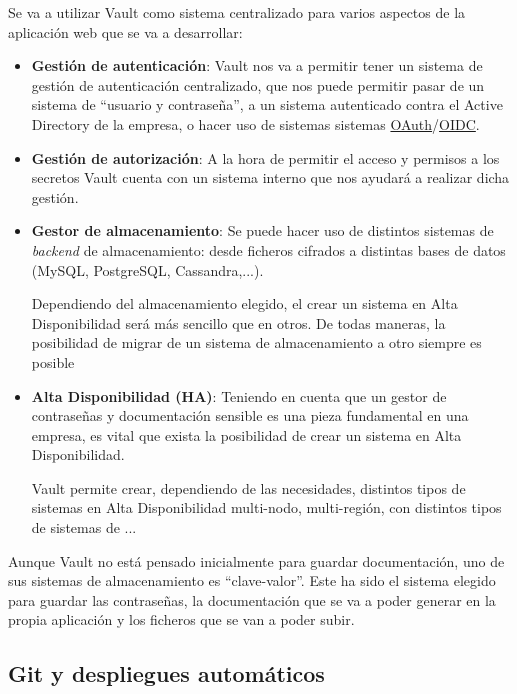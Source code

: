 \documentclass{\ClassPath/viu-tfm-template}
\begin{document}
Se va a utilizar Vault como sistema centralizado para varios aspectos de la aplicación web que se va a desarrollar:

\begin{itemize}
    \item \textbf{Gestión de autenticación}: Vault nos va a permitir tener un sistema de gestión de autenticación centralizado, que nos puede permitir pasar de un sistema de “usuario y contraseña”, a un sistema autenticado contra el Active Directory de la empresa, o hacer uso de sistemas sistemas \href{https://en.wikipedia.org/wiki/OAuth}{OAuth}/\href{https://en.wikipedia.org/wiki/OpenID#OpenID_Connect_(OIDC)}{OIDC}.

    \item \textbf{Gestión de autorización}: A la hora de permitir el acceso y permisos a los secretos Vault cuenta con un sistema interno que nos ayudará a realizar dicha gestión.

    \item \textbf{Gestor de almacenamiento}: Se puede hacer uso de distintos sistemas de \textit{backend} de almacenamiento: desde ficheros cifrados a distintas bases de datos (MySQL, PostgreSQL, Cassandra,...).

    Dependiendo del almacenamiento elegido, el crear un sistema en Alta Disponibilidad será más sencillo que en otros. De todas maneras, la posibilidad de migrar de un sistema de almacenamiento a otro siempre es posible

    \item \textbf{Alta Disponibilidad (HA)}: Teniendo en cuenta que un gestor de contraseñas y documentación sensible es una pieza fundamental en una empresa, es vital que exista la posibilidad de crear un sistema en Alta Disponibilidad.

    Vault permite crear, dependiendo de las necesidades, distintos tipos de sistemas en Alta Disponibilidad multi-nodo, multi-región, con distintos tipos de sistemas de  ...

\end{itemize}

Aunque Vault no está pensado inicialmente para guardar documentación, uno de sus sistemas de almacenamiento es “clave-valor”.  Este ha sido el sistema elegido para guardar las contraseñas, la documentación que se va a poder generar en la propia aplicación y los ficheros que se van a poder subir.


\subsection{Git y despliegues automáticos}
\end{document}
